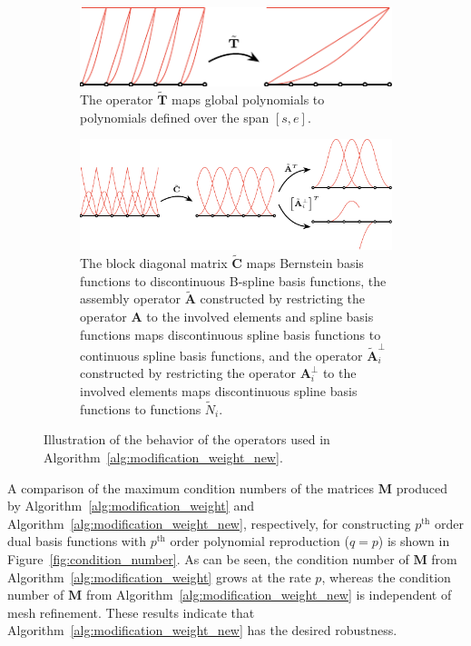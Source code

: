 \begin{figure}[ht]
	\begin{subfigure}{\linewidth}
		\center
		\includegraphics[scale=1.4]{algorithm_4_demo2}
		\caption{The operator $\tilde{\mathbf{T}}$ maps global polynomials to polynomials defined over the span $\left[s,e\right]$.}\label{fig:T-tilde}
	\end{subfigure}
	\begin{subfigure}{\linewidth}
		\center
		\includegraphics[scale=1.4]{algorithm_4_demo1}
		\caption{The block diagonal matrix $\tilde{\mathbf{C}}$ maps Bernstein basis functions to discontinuous B-spline basis functions, the assembly operator $\tilde{\mathbf{A}}$ constructed by restricting the operator $\mathbf{A}$ to the involved elements and spline basis functions maps discontinuous spline basis functions to continuous spline basis functions, and the operator $\tilde{\mathbf{A}}^\perp_i$ constructed by restricting the operator $\mathbf{A}^\perp_i$ to the involved elements maps discontinuous spline basis functions to functions $\tilde{N}_i$.}\label{fig:C_tilde_and_A_tilde}
	\end{subfigure}
	\caption{Illustration of the behavior of the operators used in Algorithm~\ref{alg:modification_weight_new}. }
\end{figure}

A comparison of the maximum condition numbers of the matrices $\mathbf{M}$ produced by Algorithm~\ref{alg:modification_weight} and Algorithm~\ref{alg:modification_weight_new}, respectively, for constructing $p^\text{th}$ order dual basis functions with $p^\text{th}$ order polynomial reproduction ($q=p$) is shown in Figure~\ref{fig:condition_number}. As can be seen, the condition number of $\mathbf{M}$ from Algorithm~\ref{alg:modification_weight} grows at the rate $p$, whereas the condition number of $\mathbf{M}$ from Algorithm~\ref{alg:modification_weight_new} is independent of mesh refinement. These results indicate that Algorithm~\ref{alg:modification_weight_new} has the desired robustness.

